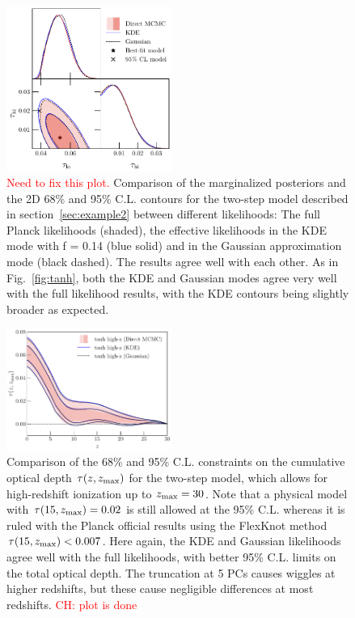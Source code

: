\documentclass[prd,twocolumn,amsmath,amssymb,floatfix,superscriptaddress,nofootinbib]{revtex4-1}
\newcommand{\refsec}[1]{section~\ref{sec:#1}}
\newcommand{\zmax}{z_{\rm max}}
\newcommand{\ch}[1]{\textcolor{red}{#1}}
\begin{document}
\begin{figure}[t]
\includegraphics[width=0.48\textwidth]{paper/plots/pl18_tanh_highz_test5_run1_vs_relike_tanh_highz_test8_run9_f0p14_taulo_prior_0p03_zre_prior_6p1_taulo_prior_0p0_tri.pdf}
\caption{\ch{Need to fix this plot.}   Comparison of the marginalized posteriors and the 2D 68\% and 95\% C.L. contours for the two-step model  described in \refsec{example2} between different likelihoods: The full Planck likelihoods (shaded), the effective likelihoods in the KDE mode with f = 0.14 (blue solid) and in the Gaussian approximation mode (black dashed). The results agree well with each other. As in Fig.~\ref{fig:tanh}, both the KDE and Gaussian modes agree very well with the full likelihood results, with the KDE  contours being slightly broader as expected.
}
\label{fig:two_parameter_model_2D}
\end{figure}

\begin{figure}
\includegraphics[width=0.48\textwidth]{plots/pl18_taugtz_tanh_highz_direct_vs_kde_vs_gaussian_dz_auto_zre_prior_6p1.pdf}
\caption{Comparison of the 68\% and 95\% C.L. constraints on the cumulative optical depth $\tau(z, \zmax)$ for the two-step model, which allows for high-redshift ionization up to $\zmax =30$. Note that a physical model with $\tau(15, \zmax) = 0.02$ is still allowed at the 95\% C.L. whereas it is ruled with the Planck official results using the FlexKnot method $\tau(15, \zmax) < 0.007$. Here again, the KDE and Gaussian likelihoods agree well with the full likelihoods, with better 95\% C.L. limits on the total optical depth. The truncation at 5 PCs causes wiggles at higher redshifts, but these cause negligible differences at most redshifts.
\ch{CH: plot is done}}
\label{fig:plot_taugtz_two_step_contours}
\end{figure}
 
\end{document}
